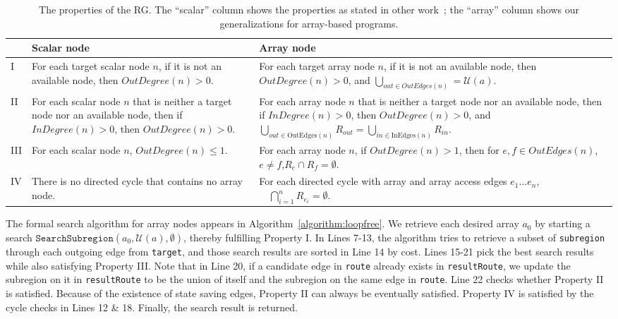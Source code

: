 \begin{table}
\centering
\begin{tabular}{| m{0.3cm} || p{5cm} | p{5cm} |}
  \hline
   & Scalar node & Array node \\
  \hline\hline
  I 
  & 
  For each target scalar node $n$, if it is not an available node, then $OutDegree(n)>0$. 
  &
  For each target array node $n$, if it is not an available node, then $OutDegree(n)>0$, and $\bigcup_{\mathit{out} \in {OutEdges}(n)}{}=  \mathcal{U}(a) $.  
   \\
  \hline
    II
  & 
  For each scalar node $n$ that is neither a target node nor an available node, then if $InDegree(n)>0$, then $OutDegree(n)>0$. 
  &
  For each array node $n$ that is neither a target node nor an available node, then if $InDegree(n)>0$, then $OutDegree(n)>0$, and $\bigcup_{\mathit{out} \in \text{OutEdges} (n)} R_{out} = \bigcup_{\mathit{in} \in \text{InEdges} (n) }R_{in} $.  
   \\
  \hline
    III
  & 
  For each scalar node $n$, $OutDegree(n) \le 1$.
  &
 For each array node $n$, if $OutDegree(n) > 1$, then  for $e,f \in OutEdges(n)$, $e \ne f$,$R_e \cap R_f = \emptyset$.
   \\
  \hline
  IV & 
  There is no directed cycle that contains no array node.
 &
 For each directed cycle with array and array access edges $e_1 \dots e_n$,  $\quad \bigcap_{i=1}^n{R_{e_{i}}} = \emptyset$.
  \\
  \hline
\end{tabular}

\caption{The properties of the RG. The ``scalar'' column shows the properties as stated in other work~\cite{Hou2012}; the ``array'' column shows our generalizations for array-based programs.}
\label{fig:RG-properties}

\end{table}


The formal search algorithm for array nodes
appears in Algorithm~\ref{algorithm:loopfree}.
We retrieve each desired array $a_0$ by starting a search $\texttt{SearchSubregion}(a_0, \mathcal{U}(a), \emptyset)$, thereby fulfilling Property I.
In Lines 7-13, the algorithm tries to retrieve a subset of \texttt{subregion} through each outgoing edge from \texttt{target}, and those search results are sorted in Line 14 by cost.
Lines 15-21 pick the best search results while also satisfying Property III.
Note that in Line 20, if a candidate edge in \texttt{route} already exists in \texttt{resultRoute}, we update the subregion on it in \texttt{resultRoute} to be the union of itself and the subregion on the same edge in \texttt{route}. 
Line 22 checks whether Property II is satisfied.
Because of the existence of state saving edges, Property II can always be eventually satisfied.
Property IV is satisfied by the cycle checks in Lines 12 \& 18.
Finally, the search result is returned.


